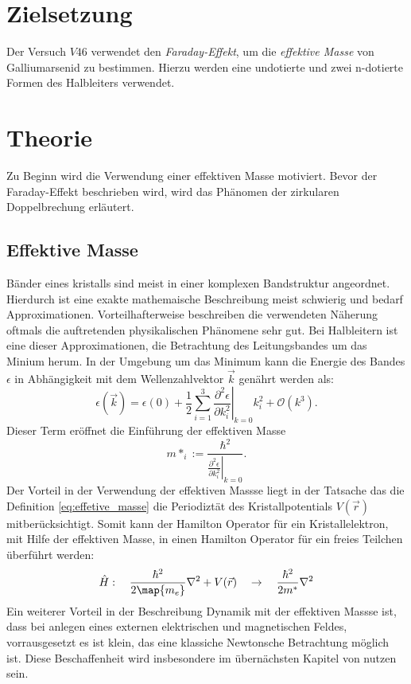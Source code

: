 \setcounter{page}{1}
\section*{Zielsetzung}
Der Versuch $V46$ verwendet den \emph{Faraday-Effekt}, um die \emph{effektive Masse} von
Galliumarsenid zu bestimmen. Hierzu werden eine undotierte und zwei n-dotierte
Formen des Halbleiters verwendet.

\section{Theorie}
Zu Beginn wird die Verwendung einer effektiven Masse motiviert.
Bevor der Faraday-Effekt beschrieben wird, wird das Phänomen der zirkularen
Doppelbrechung erläutert.

\subsection{Effektive Masse}\label{sec:effektive_masse}
 Bänder eines kristalls sind meist in einer komplexen Bandstruktur angeordnet.
Hierdurch ist eine exakte mathemaische Beschreibung meist schwierig und bedarf
Approximationen. Vorteilhafterweise beschreiben die verwendeten Näherung oftmals
die auftretenden physikalischen Phänomene sehr gut. Bei Halbleitern ist eine
dieser Approximationen, die Betrachtung des Leitungsbandes um das Minium herum.
In der Umgebung um das Minimum kann die Energie des Bandes $\epsilon$
in Abhängigkeit mit dem Wellenzahlvektor $\vec{k}$ genährt werden als:
\begin{equation}
  \label{eq:gleichung_energie}
  \epsilon(\vec{k})=\epsilon(0) + \frac{1}{2}\sum_{i=1}^3 \left.\frac{\partial^2 \epsilon}{\partial k_i^2}\right|_{k=0}k_i^2 + \mathcal{O}(k^3).
\end{equation}
Dieser Term eröffnet die Einführung der effektiven Masse
\begin{equation}
  \label{eq:effetive_masse}
  m*_i := \frac{\hbar^2}{\left.\frac{\partial^2 \epsilon}{\partial k_i^2}\right|_{k=0}}.
\end{equation}
Der Vorteil in der Verwendung der effektiven Massse liegt in der Tatsache das
die Definition \eqref{eq:effetive_masse} die Periodiztät des  Kristallpotentials
$V(\vec{r})$ mitberücksichtigt. Somit kann der Hamilton Operator für ein Kristallelektron,
mit Hilfe der effektiven Masse, in einen Hamilton Operator für ein freies
Teilchen überführt werden:
\begin{equation*}
  \hat{H}:\quad \frac{\hbar^2}{2\map{m_e}}\nabla^2 + V(\vec{r}) \quad \rightarrow \quad   \frac{\hbar^2}{2m^*}\nabla^2
\end{equation*}
Ein weiterer Vorteil in der Beschreibung Dynamik mit der effektiven Massse ist,
dass bei anlegen eines externen elektrischen und magnetischen Feldes,
vorrausgesetzt es ist klein, das eine klassiche Newtonsche Betrachtung möglich ist.
Diese Beschaffenheit wird insbesondere im übernächsten Kapitel von nutzen sein.
